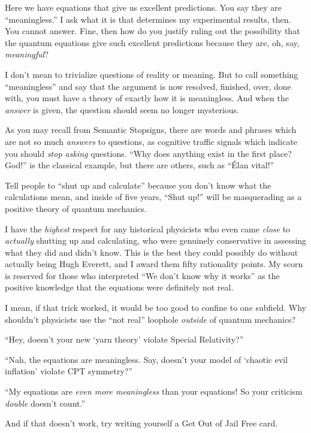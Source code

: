 {
 Here we have equations that give us excellent predictions. You say
they are ``meaningless.'' I ask what
it is that determines my experimental results, then. You cannot answer.
Fine, then how do you justify ruling out the possibility that the
quantum equations give such excellent predictions because they are, oh,
say, \textit{meaningful}?}

{
 I don't mean to trivialize questions of reality or
meaning. But to call something
``meaningless'' and say that the
argument is now resolved, finished, over, done with, you must have a
theory of exactly how it is meaningless. And when the \textit{answer}
is given, the question should seem no longer mysterious.}

{
 As you may recall from Semantic Stopsigns, there are words and
phrases which are not so much \textit{answers} to questions, as
cognitive traffic signals which indicate you should \textit{stop
asking} questions. ``Why does anything exist in the
first place? God!'' is the classical example, but
there are others, such as ``Élan
vital!''}

{
 Tell people to ``shut up and
calculate'' because you don't know
what the calculations mean, and inside of five years,
``Shut up!'' will be masquerading as
a positive theory of quantum mechanics.}

{
 I have the \textit{highest} respect for any historical physicists
who even came \textit{close} to \textit{actually} shutting up and
calculating, who were genuinely conservative in assessing what they did
and didn't know. This is the best they could possibly
do without actually being Hugh Everett, and I award them fifty
rationality points. My scorn is reserved for those who interpreted
``We don't know why it
works'' as the positive knowledge that the equations
were definitely not real.}

{
 I mean, if that trick worked, it would be too good to confine to
one subfield. Why shouldn't physicists use the
``not real'' loophole
\textit{outside} of quantum mechanics?}

{
 ``Hey, doesn't your new
`yarn theory' violate Special
Relativity?''}

{
 ``Nah, the equations are meaningless. Say,
doesn't your model of `chaotic evil
inflation' violate CPT symmetry?''}

{
 ``My equations are \textit{even more meaningless}
than your equations! So your criticism \textit{double}
doesn't count.''}

{
 And if that doesn't work, try writing yourself a
Get Out of Jail Free card.}


